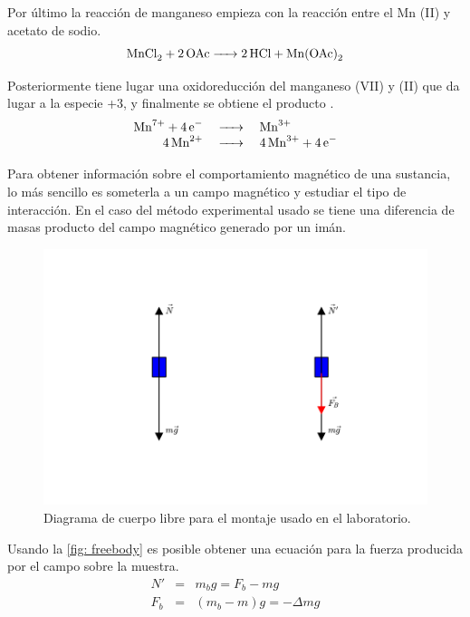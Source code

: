 \documentclass[fleqn,10pt]{SelfArx} %
\begin{document}
	Por \'ultimo la reacci\'on de manganeso empieza con la reacci\'on entre el Mn (II) y acetato de sodio.
	\begin{equation}
	    \ce{MnCl2 + 2OAc -> 2HCl + Mn(OAc)2}
	\end{equation}
	
	Posteriormente tiene lugar una oxidoreducci\'on del manganeso (VII) y (II) que da lugar a la especie +3, y finalmente se obtiene el producto .
	\begin{equation}\label{eq: redox}
	    \begin{array}{rcl}
	        \ce{Mn^{7+} + 4e^-} & \ce{->} & \ce{Mn^{3+}}\\
	        \ce{4Mn^{2+}} & \ce{->} & \ce{4Mn^{3+} + 4e-}
	    \end{array}
	\end{equation}
	
	Para obtener informaci\'on sobre el comportamiento magn\'etico de una sustancia, lo m\'as sencillo es someterla a un campo magn\'etico y estudiar el tipo de interacci\'on. En el caso del m\'etodo experimental usado se tiene una diferencia de masas producto del campo magn\'etico generado por un im\'an.
	\begin{figure}[h]
	    \centering
	    \includegraphics[width=0.7\linewidth]{images/free_body.pdf}
	    \caption{Diagrama de cuerpo libre para el montaje usado en el laboratorio.}
	    \label{fig: freebody}
	\end{figure}
	
	Usando la \autoref{fig: freebody} es posible obtener una ecuaci\'on para la fuerza producida por el campo sobre la muestra.
	\begin{equation}
	    \begin{array}{rcl}
	        N' & = & m_bg = F_b - mg \\
	        F_b & = & (m_b-m)g = - \Delta mg
	    \end{array}
	\end{equation}
	
\end{document}
